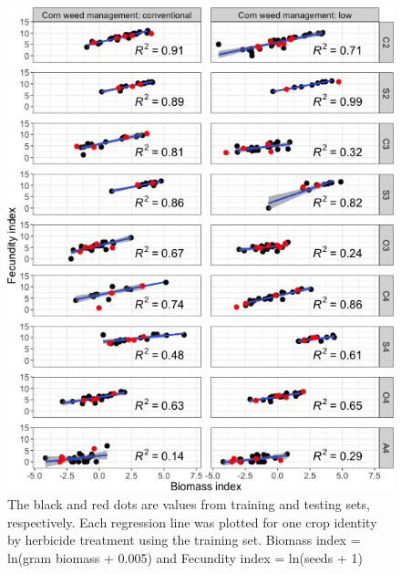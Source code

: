 \documentclass[
]{article}
\begin{document}
\begin{figure}
\centering
\includegraphics{Individual-fecundity-model_files/figure-latex/full-p-1.png}
\caption{\label{fig:full-p}The black and red dots are values from training and testing sets, respectively. Each regression line was plotted for one crop identity by herbicide treatment using the training set. Biomass index = ln(gram biomass + 0.005) and Fecundity index = ln(seeds + 1)}
\end{figure}
\end{document}
